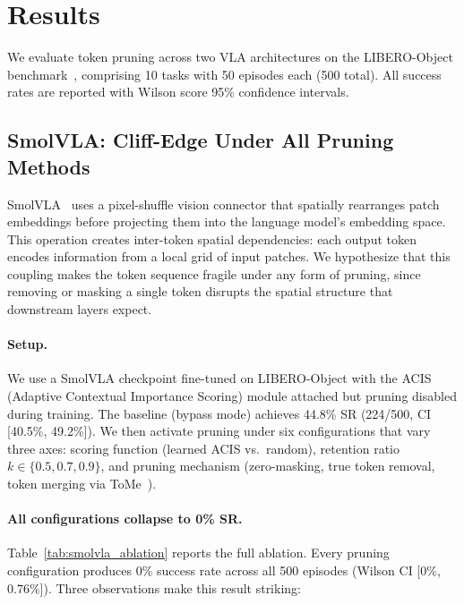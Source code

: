 \section{Results}
\label{sec:results}

We evaluate token pruning across two VLA architectures on the LIBERO-Object benchmark~\cite{liu2023libero}, comprising 10 tasks with 50 episodes each (500 total). All success rates are reported with Wilson score 95\% confidence intervals.

\subsection{SmolVLA: Cliff-Edge Under All Pruning Methods}
\label{sec:smolvla_results}

SmolVLA~\cite{shukor2025smolvla} uses a pixel-shuffle vision connector that spatially rearranges patch embeddings before projecting them into the language model's embedding space. This operation creates inter-token spatial dependencies: each output token encodes information from a local grid of input patches. We hypothesize that this coupling makes the token sequence fragile under any form of pruning, since removing or masking a single token disrupts the spatial structure that downstream layers expect.

\paragraph{Setup.}
We use a SmolVLA checkpoint fine-tuned on LIBERO-Object with the ACIS (Adaptive Contextual Importance Scoring) module attached but pruning disabled during training. The baseline (bypass mode) achieves 44.8\% SR (224/500, CI [40.5\%, 49.2\%]). We then activate pruning under six configurations that vary three axes: scoring function (learned ACIS vs.\ random), retention ratio $k \in \{0.5, 0.7, 0.9\}$, and pruning mechanism (zero-masking, true token removal, token merging via ToMe~\cite{bolya2023tome}).

\paragraph{All configurations collapse to 0\% SR.}
Table~\ref{tab:smolvla_ablation} reports the full ablation. Every pruning configuration produces 0\% success rate across all 500 episodes (Wilson CI [0\%, 0.76\%]). Three observations make this result striking:

